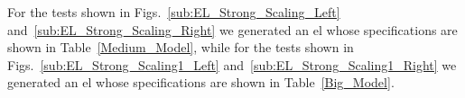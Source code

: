 \documentclass[10pt,journal,compsoc]{IEEEtran}
\begin{document}

For the tests shown in Figs.~\ref{sub:EL_Strong_Scaling_Left} and~\ref{sub:EL_Strong_Scaling_Right} we generated an \gls{el} whose specifications are shown in Table~\ref{Medium_Model}, while for the tests shown in Figs.~\ref{sub:EL_Strong_Scaling1_Left} and~\ref{sub:EL_Strong_Scaling1_Right} we generated an \gls{el} whose specifications are shown in Table~\ref{Big_Model}.
\end{document}
